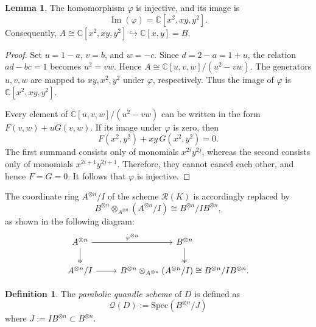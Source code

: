 \documentclass[12pt,reqno]{amsart}
\newcommand{\calQ}{\mathcal{Q}}
\newcommand{\calR}{\mathcal{R}}
\newcommand{\Spec}{\mathrm{Spec}}
\theoremstyle{definition}
\newtheorem{lemma}[theorem]{Lemma}
\newtheorem{definition}[theorem]{Definition}
\begin{document}
	\begin{lemma}\label{lem.inj}
		The homomorphism $\varphi$ is injective, and its image is
		\[
		\operatorname{Im}(\varphi) = \mathbb{C}[x^2,xy,y^2].
		\]
		Consequently, $A \cong \mathbb{C}[x^2,xy,y^2] \hookrightarrow \mathbb{C}[x,y]=B$.
	\end{lemma}
	
	\begin{proof}
		Set $u=1-a$, $v=b$, and $w=-c$.
		Since $d=2-a=1+u$, the relation $ad-bc=1$ becomes $u^2=vw$.
		Hence $A \cong \mathbb{C}[u,v,w]/(u^2-vw)$.
		The generators $u,v,w$ are mapped to $xy, x^2,y^2$ under $\varphi$, respectively.
		Thus the image of $\varphi$ is $\mathbb{C}[x^2,xy,y^2]$.
		
		Every element of $\mathbb{C}[u,v,w]/(u^2-vw)$ can be written in the form $F(v,w)+uG(v,w)$.
		If its image under $\varphi$ is zero, then
		\[
		  F(x^2,y^2)+xy\,G(x^2,y^2)=0.
		\]
		The first summand consists only of monomials $x^{2i}y^{2j}$, whereas the
		second consists only of monomials $x^{2i+1}y^{2j+1}$. Therefore, they
		cannot cancel each other, and hence $F=G=0$. It follows that $\varphi$ is injective.
	\end{proof}
	
	The coordinate ring $A^{\otimes n}/I$ of the scheme $\calR(K)$ is accordingly replaced by
	$$
	   B^{\otimes n}\otimes_{A^{\otimes n}}(A^{\otimes n}/I) \cong B^{\otimes n}/IB^{\otimes n},
	$$
	as shown in the following diagram:
	\begin{equation} \label{eqn.diagram}	
		\begin{tikzcd}
			A^{\otimes n}
			\arrow[r, "\varphi^{\otimes n}"]
			\arrow[d, two heads]
			&
			B^{\otimes n}
			\arrow[d, two heads]
			\\
			A^{\otimes n}/I
			\arrow[r]
			&
			B^{\otimes n}\otimes_{A^{\otimes n}}(A^{\otimes n}/I)
			\cong B^{\otimes n}/IB^{\otimes n}.
		\end{tikzcd}
	\end{equation}

    
	\begin{definition} 
        The \emph{parabolic quandle scheme} of $D$ is defined as $$\calQ(D) := \Spec (B^{\otimes n}/J)$$
		where $J := I B^{\otimes n} \subset B^{\otimes n}$.
	\end{definition}
    
\end{document}
